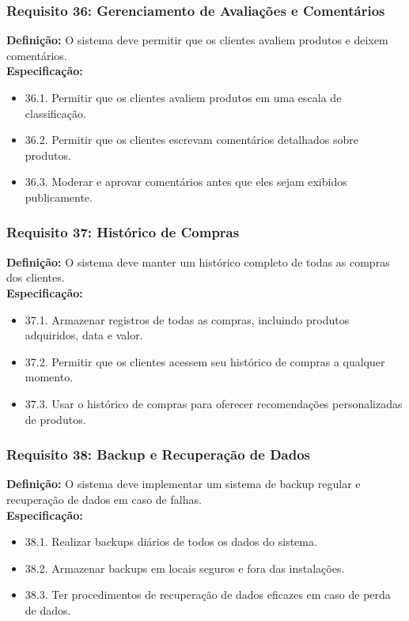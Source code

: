 \subsubsection{Requisito 36: Gerenciamento de Avaliações e Comentários}
\textbf{Definição:} O sistema deve permitir que os clientes avaliem produtos e deixem comentários.
\\
\textbf{Especificação:}
\begin{itemize}
	\item 36.1. Permitir que os clientes avaliem produtos em uma escala de classificação.
	\item 36.2. Permitir que os clientes escrevam comentários detalhados sobre produtos.
	\item 36.3. Moderar e aprovar comentários antes que eles sejam exibidos publicamente.
\end{itemize}

\subsubsection{Requisito 37: Histórico de Compras}
\textbf{Definição:} O sistema deve manter um histórico completo de todas as compras dos clientes.
\\
\textbf{Especificação:}
\begin{itemize}
	\item 37.1. Armazenar registros de todas as compras, incluindo produtos adquiridos, data e valor.
	\item 37.2. Permitir que os clientes acessem seu histórico de compras a qualquer momento.
	\item 37.3. Usar o histórico de compras para oferecer recomendações personalizadas de produtos.
\end{itemize}

\subsubsection{Requisito 38: Backup e Recuperação de Dados}
\textbf{Definição:} O sistema deve implementar um sistema de backup regular e recuperação de dados em caso de falhas.
\\
\textbf{Especificação:}
\begin{itemize}
	\item 38.1. Realizar backups diários de todos os dados do sistema.
	\item 38.2. Armazenar backups em locais seguros e fora das instalações.
	\item 38.3. Ter procedimentos de recuperação de dados eficazes em caso de perda de dados.
\end{itemize}

